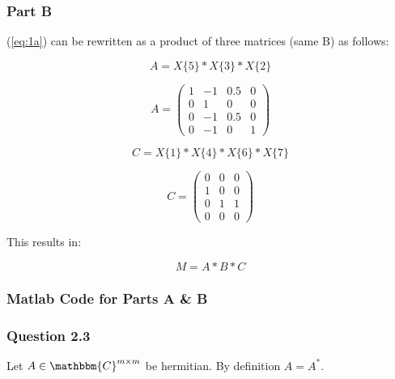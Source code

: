 \newpage
\subsubsection{Part B}

(\ref{eq:1a}) can be rewritten as a product of three matrices (same B) as follows:

\begin{equation}
  A = X\{5\}*X\{3\}*X\{2\}
\end{equation}

\begin{equation}
  A = 
  \begin{pmatrix}
    1 & -1 & 0.5 & 0 \\
    0 & 1 & 0 & 0 \\
    0 & -1 & 0.5 & 0\\
    0 & -1 & 0 & 1
  \end{pmatrix}
\end{equation}


\begin{equation}
  C = X\{1\}*X\{4\}*X\{6\}*X\{7\}
\end{equation}

\begin{equation}
  C = 
  \begin{pmatrix}
    0 & 0 & 0 \\
    1 & 0 & 0 \\
    0 & 1 & 1 \\
    0 & 0 & 0
  \end{pmatrix}
\end{equation}


This results in:

\begin{equation}
  \boxed{M = A*B*C}
\end{equation}

\newpage
\subsubsection{Matlab Code for Parts A \& B}


\newpage
\subsubsection{Question 2.3}

Let \(A \in \mathbbm{C}^{m \times m} \) be hermitian. By definition \(A = A^{*} \).

